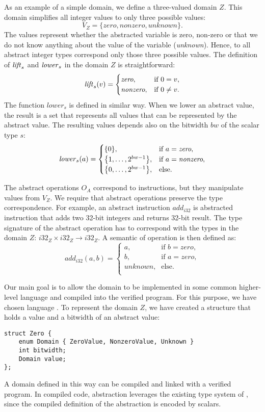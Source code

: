 As an example of a simple domain, we define a three-valued domain $Z$.
This domain simplifies all integer values to only three possible values:
\[ V_Z = \{ \textit{zero}, \textit{nonzero}, \textit{unknown} \}.\]
The values represent whether the abstracted variable is zero, non-zero or that
we do not know anything about the value of the variable (\emph{unknown}).
Hence, to all abstract integer types correspond only those three possible
values. The definition of $\mathit{lift}_s$ and $\mathit{lower}_s$ in the domain $Z$ is straightforward:
\[
  \mathit{lift}_s(v) =
  \begin{cases}
    \textit{zero},    & \text{if } 0 = v, \\
    \textit{nonzero}, & \text{if } 0 \not = v.\\
  \end{cases}
\]
The function $lower_s$ is defined in similar way. When we lower an
abstract value, the result is a set that represents all values that can be
represented by the abstract value. The resulting values depends also on the
bitwidth $bw$ of the scalar type $s$:
\[
  \mathit{lower}_s(a) =
  \begin{cases}
        \{0\},                            & \text{if } a = \textit{zero},\\
        \big\{1, \dots ,2^{bw - 1}\big\}, & \text{if } a = \textit{nonzero},\\
        \big\{0, \dots ,2^{bw - 1}\big\}, & \text{else}. \\
  \end{cases}
\]

The abstract operations $O_A$ correspond to \LLVM instructions, but they
manipulate values from $V_Z$. We require that abstract operations preserve the
type correspondence. For example, an abstract instruction $\mathit{add}_{i32}$ is
abstracted \LLVM instruction that adds two 32-bit integers and returns 32-bit
result. The type signature of the abstract operation has to correspond with the
types in the domain $Z$: ${i32}_Z \times {i32}_Z \to {i32}_Z$. A semantic of
operation is then defined as:
\[
  \mathit{add}_{i32}(a, b) =
  \begin{cases}
    a,      & \text{if } b = \textit{zero},\\
    b,      & \text{if } a = \textit{zero},\\
    \textit{unknown},   & \text{else}. \\
  \end{cases}
\]

Our main goal is to allow the domain to be implemented in some common higher-level
language and compiled into the verified program. For this purpose,
we have chosen language \Cpp{}. To represent the domain $Z$, we have created a
structure that holds a value and a bitwidth of an abstract value:
\begin{verbatim}
struct Zero {
    enum Domain { ZeroValue, NonzeroValue, Unknown }
    int bitwidth;
    Domain value;
};
\end{verbatim}
A domain defined in this way can be compiled and linked with a verified
program. In compiled code, abstraction leverages the existing type system of
\LLVM, since the compiled definition of the abstraction is encoded by \LLVM scalars.

